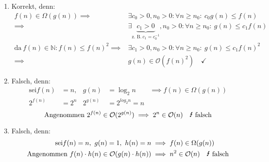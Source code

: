 \begin{enumerate}
	\item Korrekt, denn: \begin{equation*}
		\begin{align}
			f(n) \in \Omega(g(n)) \implies &\exists c_0 > 0, n_0 > 0: \forall n \ge n_0:\ c_0 g(n) \le f(n)\\
			\implies &\exists \underbrace{c_1 > 0}_{\text{z. B.}\ c_1 = c_0^{-1}}, n_0 > 0: \forall n \ge n_0:\ g(n) \le c_1 f(n)\\
			\text{da}\ f(n) \in \mathbb{N}: f(n) \le f(n)^2 \implies &\exists c_1 > 0, n_0 > 0: \forall n \ge n_0:\ g(n) \le c_1 f(n)^2\\
			\implies &g(n) \in \mathcal{O}(f(n)^2)\quad\checkmark
		\end{align}
	\end{equation*}
	\item Falsch, denn:
		\begin{equation*}
			\begin{align*}
				\text{sei} f(n) &= n, &g(n) &= \log_2{n} &\implies f(n) \in \Omega(g(n))\\
				2^{f(n)} &= 2^n &2^{g(n)} &= 2^{log_2{n}} = n
			\end{align*}
		\end{equation*}
		\begin{equation*}
			\text{Angenommen}\ 2^{f(n)} \in \mathcal{O}(2^{g(n)}) \implies 2^n \in \mathcal{O}(n)\quad\text{\Lightning\ falsch}
		\end{equation*}

	\item Falsch, denn:
		\begin{equation*}
			\begin{align*}
				\text{sei} f(n) = n,\ g(n) = 1,\ h(n) = n &\implies f(n) \in \Omega(g(n))\\
				\text{Angenommen}\ f(n) \cdot h(n) \in \mathcal{O}(g(n) \cdot h(n)) &\implies n^2 \in \mathcal{O}(n)\quad\text{\Lightning\ falsch}
			\end{align*}
		\end{equation*}
\end{enumerate}


